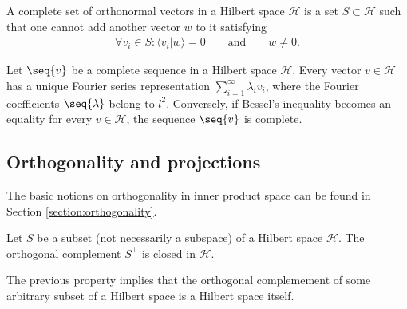     \begin{adefinition}
        A complete set of orthonormal vectors in a Hilbert space $\mathcal{H}$ is a set $S\subset\mathcal{H}$ such that one cannot add another vector $w$ to it satisfying
        \begin{gather}
            \forall v_i\in S:\langle v_i|w \rangle = 0\qquad\text{and}\qquad w\neq0.
        \end{gather}
    \end{adefinition}

    \begin{theorem}[Parceval]
        Let $\seq{v}$ be a complete sequence in a Hilbert space $\mathcal{H}$. Every vector $v\in\mathcal{H}$ has a unique Fourier series representation $\sum_{i=1}^\infty\lambda_iv_i$, where the Fourier coefficients $\seq{\lambda}$ belong to $l^2$. Conversely, if Bessel's inequality becomes an equality for every $v\in\mathcal{H}$, the sequence $\seq{v}$ is complete.
    \end{theorem}

\subsection{Orthogonality and projections}

    The basic notions on orthogonality in inner product space can be found in Section \ref{section:orthogonality}.

    \begin{property}
        Let $S$ be a subset (not necessarily a subspace) of a Hilbert space $\mathcal{H}$. The orthogonal complement $S^\perp$ is closed in $\mathcal{H}$.
    \end{property}
    \begin{result}
        The previous property implies that the orthogonal complemement of some arbitrary subset of a Hilbert space is a Hilbert space itself.
    \end{result}

